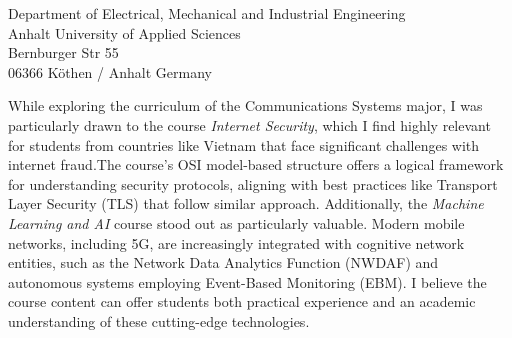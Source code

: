 \documentclass[a4paper,12pt]{letter}
\begin{document}
\begin{letter}{
    Department of Electrical, Mechanical and Industrial Engineering
    \\ Anhalt University of Applied Sciences
    \\ Bernburger Str 55 
    \\ 06366 Köthen / Anhalt Germany
}

\vspace{1cm}
While exploring the curriculum of the Communications Systems major, I was particularly drawn to the course \textit{Internet Security}, which I find highly relevant for students from countries like Vietnam that face significant challenges with internet fraud.The course’s OSI model-based structure offers a logical framework for understanding security protocols, aligning with best practices like Transport Layer Security (TLS) that follow similar approach. Additionally, the \textit{Machine Learning and AI} course stood out as particularly valuable. Modern mobile networks, including 5G, are increasingly integrated with cognitive network entities, such as the Network Data Analytics Function (NWDAF) and autonomous systems employing Event-Based Monitoring (EBM). I believe the course content can offer students both practical experience and an academic understanding of these cutting-edge technologies.


\end{letter}
\end{document}
